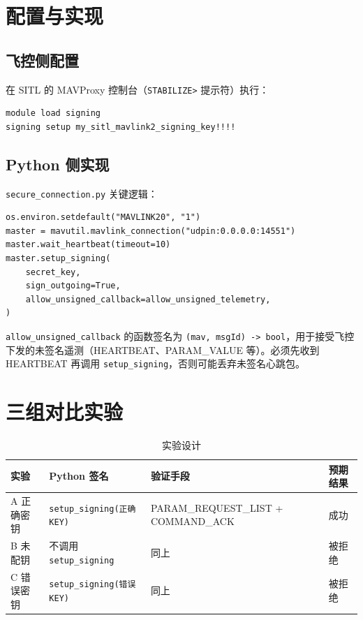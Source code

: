 \documentclass[12pt,a4paper]{article}
\begin{document}
\section{配置与实现}

\subsection{飞控侧配置}

在 SITL 的 MAVProxy 控制台（\texttt{STABILIZE>} 提示符）执行：

\begin{lstlisting}
module load signing
signing setup my_sitl_mavlink2_signing_key!!!!
\end{lstlisting}

\subsection{Python 侧实现}

\texttt{secure\_connection.py} 关键逻辑：

\begin{lstlisting}
os.environ.setdefault("MAVLINK20", "1")
master = mavutil.mavlink_connection("udpin:0.0.0.0:14551")
master.wait_heartbeat(timeout=10)
master.setup_signing(
    secret_key,
    sign_outgoing=True,
    allow_unsigned_callback=allow_unsigned_telemetry,
)
\end{lstlisting}

\texttt{allow\_unsigned\_callback} 的函数签名为 \texttt{(mav, msgId) -> bool}，用于接受飞控下发的未签名遥测（HEARTBEAT、PARAM\_VALUE 等）。必须先收到 HEARTBEAT 再调用 \texttt{setup\_signing}，否则可能丢弃未签名心跳包。

\section{三组对比实验}

\begin{table}[htbp]
\centering
\caption{实验设计}
\begin{tabular}{p{2.5cm}p{3.5cm}p{3.5cm}p{3.5cm}}
\toprule
\textbf{实验} & \textbf{Python 签名} & \textbf{验证手段} & \textbf{预期结果} \\
\midrule
A 正确密钥 & \texttt{setup\_signing(正确KEY)} & PARAM\_REQUEST\_LIST + COMMAND\_ACK & 成功 \\
B 未配钥 & 不调用 \texttt{setup\_signing} & 同上 & 被拒绝 \\
C 错误密钥 & \texttt{setup\_signing(错误KEY)} & 同上 & 被拒绝 \\
\bottomrule
\end{tabular}
\end{table}
\end{document}
